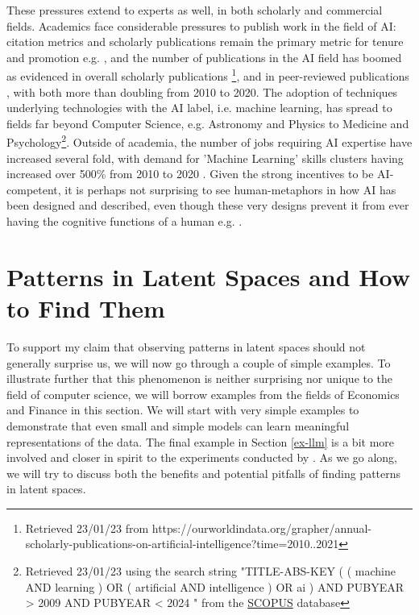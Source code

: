 \documentclass{article}
\theoremstyle{plain}
\theoremstyle{definition}
\theoremstyle{remark}
\begin{document}
These pressures extend to experts as well, in both scholarly and commercial fields. Academics face considerable pressures to publish work in the field of AI: citation metrics and scholarly publications remain the primary metric for tenure and promotion e.g. \cite{alperin2019significant}, and the number of publications in the AI field has boomed as evidenced in overall scholarly publications \footnote{ Retrieved 23/01/23 from https://ourworldindata.org/grapher/annual-scholarly-publications-on-artificial-intelligence?time=2010..2021 }, and in peer-reviewed publications \cite{Maslej2023-pi}, with both more than doubling from 2010 to 2020. The adoption of techniques underlying technologies with the AI label, i.e. machine learning, has spread to fields far beyond Computer Science, e.g. Astronomy and Physics to Medicine and Psychology\footnote{Retrieved 23/01/23 using the search string "TITLE-ABS-KEY ( ( machine  AND  learning )  OR  ( artificial  AND  intelligence )  OR  ai )  AND  PUBYEAR  >  2009  AND  PUBYEAR  <  2024 " from the \href{https://www.scopus.com/}{SCOPUS} database}. Outside of academia, the number of jobs requiring AI expertise have increased several fold, with demand for 'Machine Learning' skills clusters having increased over 500\% from 2010 to 2020 \cite{Maslej2023-pi}. Given the strong incentives to be AI-competent, it is perhaps not surprising to see human-metaphors in how AI has been designed and described, even though these very designs prevent it from ever having the cognitive functions of a human e.g. \cite{salles2020anthropomorphism, van2023reclaiming}. 

\section{Patterns in Latent Spaces and How to Find
Them}\label{patterns-in-latent-spaces-and-how-to-find-them}

To support my claim that observing patterns in latent spaces should not
generally surprise us, we will now go through a couple of simple
examples. To illustrate further that this phenomenon is neither
surprising nor unique to the field of computer science, we will borrow examples from the fields of Economics and Finance in this section. We will start with very simple examples to demonstrate that even small and simple models can learn meaningful representations of the data. The final example in Section \ref{ex-llm} is a bit more involved and closer in spirit to the experiments conducted by \cite{gurnee2023language}. As we go along, we will try to discuss both the benefits and potential
pitfalls of finding patterns in latent spaces.
\end{document}

